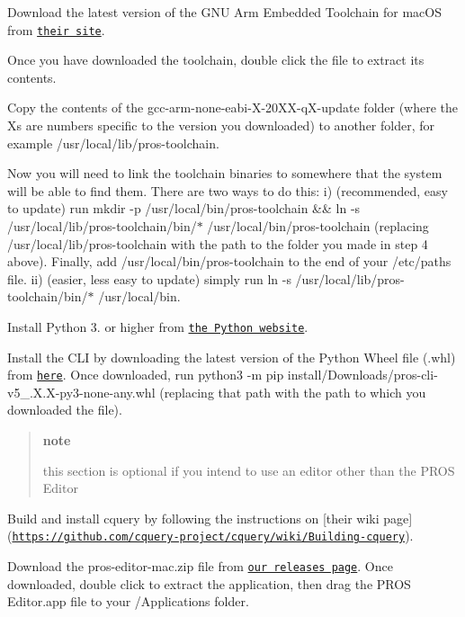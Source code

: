 \begin{DoxyEnumerate}
\item Download the latest version of the G\+NU Arm Embedded Toolchain for mac\+OS from \href{https://developer.arm.com/open-source/gnu-toolchain/gnu-rm/downloads}{\tt their site}.
\item Once you have downloaded the toolchain, double click the file to extract its contents.
\item Copy the contents of the gcc-\/arm-\/none-\/eabi-\/\+X-\/20\+X\+X-\/q\+X-\/update folder (where the Xs are numbers specific to the version you downloaded) to another folder, for example /usr/local/lib/pros-\/toolchain.
\item Now you will need to link the toolchain binaries to somewhere that the system will be able to find them. There are two ways to do this\+: i) (recommended, easy to update) run {\ttfamily mkdir -\/p /usr/local/bin/pros-\/toolchain \&\& ln -\/s /usr/local/lib/pros-\/toolchain/bin/$\ast$ /usr/local/bin/pros-\/toolchain} (replacing {\ttfamily /usr/local/lib/pros-\/toolchain} with the path to the folder you made in step 4 above). Finally, add {\ttfamily /usr/local/bin/pros-\/toolchain} to the end of your {\ttfamily /etc/paths} file. ii) (easier, less easy to update) simply run {\ttfamily ln -\/s /usr/local/lib/pros-\/toolchain/bin/$\ast$ /usr/local/bin}.
\end{DoxyEnumerate}


\begin{DoxyEnumerate}
\item Install Python 3. or higher from \href{http://python.org}{\tt the Python website}.
\item Install the C\+LI by downloading the latest version of the Python Wheel file (.whl) from \href{https://github.com/purduesigbots/pros-cli3/releases/latest}{\tt here}. Once downloaded, run python3 -\/m pip install/\+Downloads/pros-\/cli-\/v5\+\_.\+X.\+X-\/py3-\/none-\/any.\+whl (replacing that path with the path to which you downloaded the file).
\end{DoxyEnumerate}

\begin{quote}
{\bfseries note}

this section is optional if you intend to use an editor other than the P\+R\+OS Editor \end{quote}



\begin{DoxyEnumerate}
\item Build and install cquery by following the instructions on \mbox{[}their wiki page\mbox{]}(\href{https://github.com/cquery-project/cquery/wiki/Building-cquery}{\tt https\+://github.\+com/cquery-\/project/cquery/wiki/\+Building-\/cquery}).
\item Download the pros-\/editor-\/mac.\+zip file from \href{https://github.com/purduesigbots/atom/releases/latest}{\tt our releases page}. Once downloaded, double click to extract the application, then drag the P\+R\+OS Editor.\+app file to your /\+Applications folder.
\end{DoxyEnumerate}

